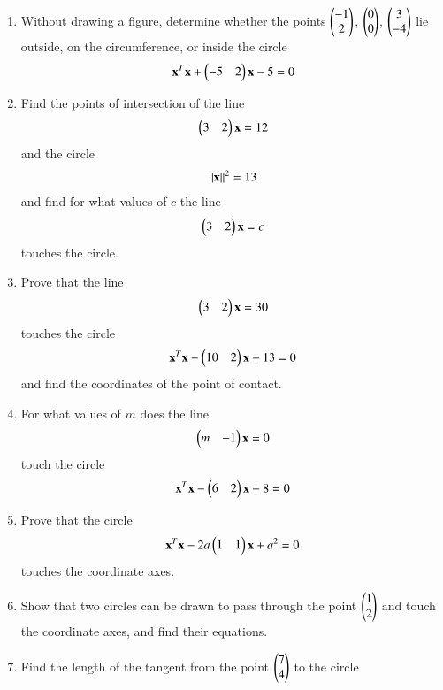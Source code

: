 \renewcommand{\theequation}{\theenumi}
\begin{enumerate}[label=\arabic*.,ref=\thesubsection.\theenumi]
\item Without drawing a figure, determine whether the points $\begin{pmatrix}-1\\2\end{pmatrix}$, $\begin{pmatrix}0\\0\end{pmatrix}$, $\begin{pmatrix}3\\-4\end{pmatrix}$ lie outside, on the circumference, or inside the circle
\begin{align}
\mathbf{x}^T\mathbf{x}+\begin{pmatrix}-5 & 2\end{pmatrix}\mathbf{x}-5 = 0
\end{align}
\item Find the points of intersection of the line 
\begin{align}
\begin{pmatrix}3 &2\end{pmatrix}\mathbf{x}=12
\end{align}
and the circle 
\begin{align}
\left\lVert\mathbf{x}\right\rVert^2=13
\end{align}
 and find for what values of $c$ the line 
\begin{align}
\begin{pmatrix}3 &2\end{pmatrix}\mathbf{x}=c
\end{align}
touches the circle.
\item Prove that the line 
\begin{align}
\begin{pmatrix}3 &2\end{pmatrix}\mathbf{x}=30
\end{align}
touches the circle
\begin{align}
\mathbf{x}^T\mathbf{x}-\begin{pmatrix}10 & 2\end{pmatrix}\mathbf{x}+13 = 0
\end{align}
and find the coordinates of the point of contact.
\item For what values of $m$ does the line 
\begin{align}
\begin{pmatrix}m &-1\end{pmatrix}\mathbf{x}=0
\end{align}
touch the circle
\begin{align}
\mathbf{x}^T\mathbf{x}-\begin{pmatrix}6 & 2\end{pmatrix}\mathbf{x}+8 = 0
\end{align}
\renewcommand{\theequation}{\theenumi}
\item Prove that the circle 
\begin{align}
\mathbf{x}^T\mathbf{x}-2a\begin{pmatrix}1 & 1\end{pmatrix}\mathbf{x}+a^2 = 0
\end{align}
touches the coordinate axes.
\item Show that two circles can be drawn to pass through the point $\begin{pmatrix}1\\2\end{pmatrix}$ and touch the coordinate axes, and find their equations.
\item Find the length of the tangent from the point $\begin{pmatrix}7\\4\end{pmatrix}$ to the circle 

\end{enumerate}
